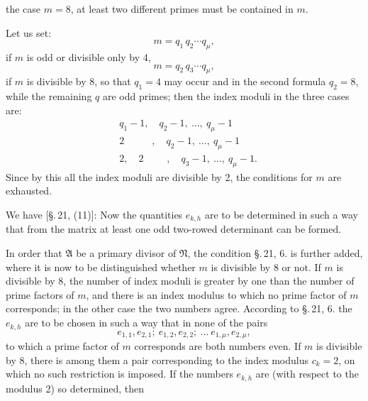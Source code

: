 the case $m = 8$, at least two different primes must be contained in $m$.

Let us set:
\[
m = q_1\, q_2 \cdots q_\mu,
\]
if $m$ is odd or divisible only by 4,
\[
m = q_2\, q_3 \cdots q_\mu,
\]
if $m$ is divisible by 8, so that $q_1 = 4$ may occur and in the second formula $q_2 = 8$, while the remaining $q$ are odd primes; then the index moduli in the three cases are:
\[
\begin{aligned}
& q_1 - 1,\quad q_2 - 1,\ \ldots,\ q_\mu - 1\\
& 2\phantom{{}_1 -{}1,}\ ,\quad q_2 - 1,\ \ldots,\ q_\mu - 1\\
& 2,\quad 2\phantom{{}_1 -{}1}\ ,\quad q_3 - 1,\ \ldots,\ q_\mu - 1.
\end{aligned}
\]
Since by this all the index moduli are divisible by 2, the conditions for $m$ are exhausted.

We have [\S.\,21, (11)]:
Now the quantities $e_{k,h}$ are to be determined in such a way that from the matrix
at least one odd two-rowed determinant can be formed.

In order that $\mathfrak{A}$ be a primary divisor of $\mathfrak{N}$, the condition \S.\,21, 6. is further added, where it is now to be distinguished whether $m$ is divisible by 8 or not. If $m$ is divisible by 8, the number of index moduli is greater by one than the number of prime factors of $m$, and there is an index modulus to which no prime factor of $m$ corresponds; in the other case the two numbers agree. According to \S.\,21, 6. the $e_{k,h}$ are to be chosen in such a way that in none of the pairs
\[
e_{1,1}, e_{2,1};\ e_{1,2}, e_{2,2};\ \ldots\ e_{1,\mu}, e_{2,\mu},
\]
to which a prime factor of $m$ corresponds are both numbers even. If $m$ is divisible by 8, there is among them a pair corresponding to the index modulus $c_k = 2$, on which no such restriction is imposed. If the numbers $e_{k,h}$ are (with respect to the modulus 2) so determined, then

